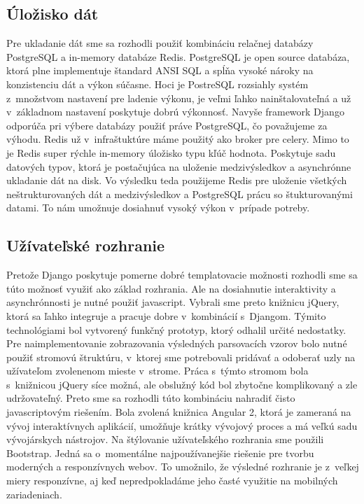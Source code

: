 \subsection{Úložisko dát}
\label{sec:store}
Pre ukladanie dát sme sa rozhodli použiť kombináciu relačnej databázy PostgreSQL a in-memory databáze Redis. PostgreSQL je open source databáza, ktorá plne implementuje štandard ANSI SQL a spĺňa vysoké nároky na konzistenciu dát a výkon súčasne. Hoci je PostreSQL  rozsiahly systém z~množstvom nastavení pre ladenie výkonu, je veľmi ľahko nainštalovateľná a už v~základnom nastavení poskytuje dobrú výkonnosť. Navyše framework Django odporúča pri výbere databázy použiť práve PostgreSQL, čo považujeme za výhodu. Redis už v~infraštuktúre máme použitý ako broker pre celery. Mimo to je Redis super rýchle in-memory úložisko typu kľúč hodnota. Poskytuje sadu datových typov, ktorá je postačujúca na uloženie medzivýsledkov a asynchrónne ukladanie dát na disk.
Vo výsledku teda použijeme Redis pre uloženie všetkých neštrukturovaných dát a medzivýsledkov a PostgreSQL prácu so štukturovanými datami. To nám umožnuje dosiahnuť vysoký výkon v~prípade potreby.

\subsection{Užívateľské rozhranie}
Pretože Django poskytuje pomerne dobré templatovacie možnosti rozhodli sme sa túto možnosť využiť ako základ rozhrania. Ale na dosiahnutie interaktivity a asynchrónnosti je nutné použiť javascript. Vybrali sme preto knižnicu jQuery, ktorá sa ľahko integruje a pracuje dobre v~kombinácií s~Djangom. Týmito technológiami bol vytvorený funkčný prototyp, ktorý odhalil určité nedostatky. Pre naimplementovanie zobrazovania výsledných parsovacích vzorov bolo nutné použiť stromovú štruktúru, v~ktorej sme potrebovali pridávať a odoberať uzly na užívateľom zvolenenom mieste v~strome. Práca s~týmto stromom bola s~knižnicou jQuery síce možná, ale obslužný kód bol zbytočne komplikovaný a zle udržovateľný. Preto sme sa rozhodli túto kombináciu nahradiť čisto javascriptovým riešením. Bola zvolená knižnica Angular 2, ktorá je zameraná na vývoj interaktívnych aplikácií, umožňuje krátky vývojový proces a má veľkú sadu vývojárskych nástrojov.
Na štýlovanie užívateľského rozhrania sme použili Bootstrap. Jedná sa o~momentálne najpoužívanejšie riešenie pre tvorbu moderných a responzívnych webov. To umožnilo, že výsledné rozhranie je z~veľkej miery responzívne, aj keď nepredpokladáme jeho časté využitie na mobilných zariadeniach.

